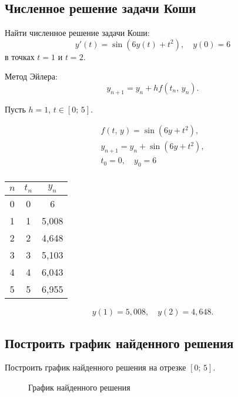 \documentclass[10pt, a4paper, titlepage]{article}
\begin{document}
\subsection*{Численное решение задачи Коши}

Найти численное решение задачи Коши: $$y'(t)=\sin(6y(t)+t^2), \quad y(0)=6$$ в точках $t=1$ и $t=2$.

Метод Эйлера:
$$y_{n+1}=y_n+hf(t_n,\,y_n) .$$

Пусть $h=1$, $t\in[0;\,5]$.

\begin{gather*}
    f(t,\,y)=\sin(6y+t^2) ,\\
    y_{n+1}=y_n+\sin(6y+t^2) ,\\
    t_0=0 , \quad y_0=6 \\
\end{gather*}

\begin{center}
    \begin{tabular}{|c|c|c|}
        \hline
        $n$ & $t_n$ & $y_n$ \\ \hline
        0 & 0 & 6 \\ \hline
        1 & 1 & 5,008 \\ \hline
        2 & 2 & 4,648 \\ \hline
        3 & 3 & 5,103 \\ \hline
        4 & 4 & 6,043 \\ \hline
        5 & 5 & 6,955 \\ \hline
    \end{tabular}
\end{center}

$$y(1)=5,008 , \quad y(2)=4,648 .$$

\subsection*{Построить график найденного решения}

Построить график найденного решения на отрезке $[0;\,5]$.

\begin{figure}[H]
    \centering
    \caption{График найденного решения}
\end{figure}
\end{document}
